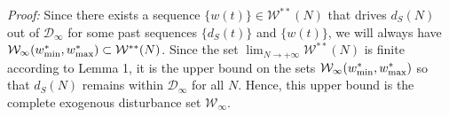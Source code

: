 \documentclass[letterpaper, 10 pt, conference]{ieeeconf}  %
\begin{document}
\vspace{2pt} 
	\textit{Proof:} Since there exists a sequence $\{w(t)\} \in \mathcal{W}^{**}(N)$ that drives $d_S(N)$ out of $\mathcal{D}_{\infty}$ for some past sequences $\{d_S(t)\}$ and $\{w(t)\}$, we will always have $\mathcal{W}_{\infty}(w^*_{\rm min},w^*_{\rm max}) \subset \mathcal{W}^{**}(N)$. Since the set $\lim_{N\rightarrow+\infty}\mathcal{W}^{**}(N)$ is finite according to Lemma 1, it is the upper bound on the sets $\mathcal{W}_{\infty}(w^*_{\rm min},w^*_{\rm max})$ so that $d_S(N)$ remains within $\mathcal{D}_{\infty}$ for all $N$. Hence, this upper bound is the complete exogenous disturbance set $\mathcal{W}_{\infty}$. \hfill\QED \vspace{-8pt} \\
\end{document}
